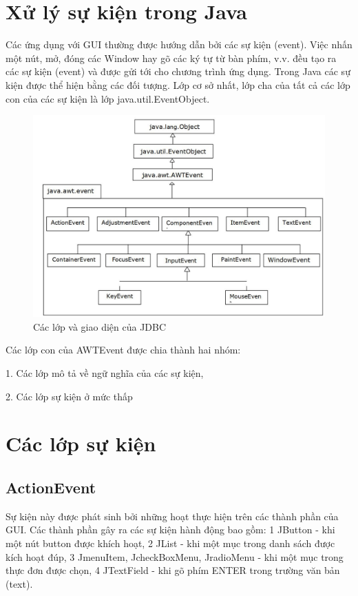 \section{Xử lý sự kiện trong Java}
Các ứng dụng với GUI thường được hướng dẫn bởi các sự kiện (event).
Việc nhấn một nút, mở, đóng các Window hay gõ các ký tự từ bàn phím, v.v. đều tạo ra các sự kiện (event) và được gửi tới cho chương trình ứng dụng. Trong Java
các sự kiện được thể hiện bằng các đối tượng. Lớp cơ sở nhất, lớp cha của tất cả
các lớp con của các sự kiện là lớp java.util.EventObject.
\begin{figure}[!ht]
	\centering
	\includegraphics[scale=0.65]{Figures//Hinhtam.jpg}
	\caption{ Các lớp và giao diện của JDBC }\label{hinh3222} 
\end{figure}
Các lớp con của AWTEvent được chia thành hai nhóm:

1. Các lớp mô tả về ngữ nghĩa của các sự kiện,

2. Các lớp sự kiện ở mức thấp
\section{Các lớp sự kiện} 
\subsection{ ActionEvent}
Sự kiện này được phát sinh bởi những hoạt thực hiện trên các thành phần của GUI. Các thành phần gây ra các sự kiện hành động bao gồm:
1 JButton - khi một nút button được khích hoạt,
2 JList - khi một mục trong danh sách được kích hoạt đúp,
3 JmenuItem, JcheckBoxMenu, JradioMenu - khi một mục trong thực đơn
được chọn,
4 JTextField - khi gõ phím ENTER trong trường văn bản (text).
